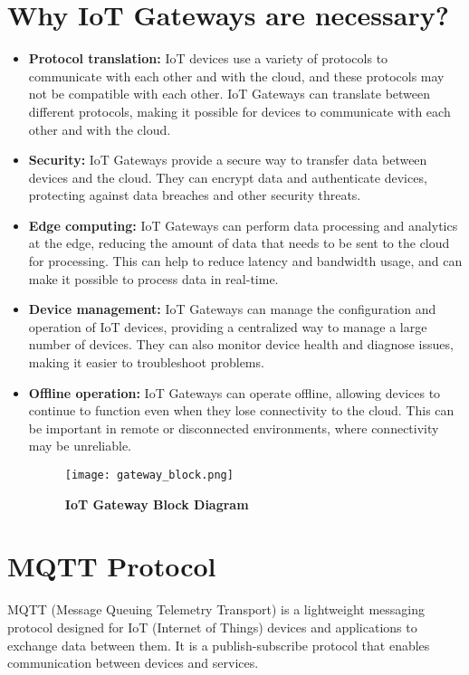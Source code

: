 \documentclass[12pt]{article}
\begin{document}
\section*{Why IoT Gateways are necessary?}
\begin{itemize}

\item \textbf{Protocol translation:} IoT devices use a variety of protocols to communicate with each other and with the cloud, and these protocols may not be compatible with each other. IoT Gateways can translate between different protocols, making it possible for devices to communicate with each other and with the cloud.

\item \textbf{Security:} IoT Gateways provide a secure way to transfer data between devices and the cloud. They can encrypt data and authenticate devices, protecting against data breaches and other security threats.

\item \textbf{ Edge computing: }IoT Gateways can perform data processing and analytics at the edge, reducing the amount of data that needs to be sent to the cloud for processing. This can help to reduce latency and bandwidth usage, and can make it possible to process data in real-time.

\item \textbf{Device management: }IoT Gateways can manage the configuration and operation of IoT devices, providing a centralized way to manage a large number of devices. They can also monitor device health and diagnose issues, making it easier to troubleshoot problems.

\item \textbf{Offline operation:} IoT Gateways can operate offline, allowing devices to continue to function even when they lose connectivity to the cloud. This can be important in remote or disconnected environments, where connectivity may be unreliable.
 \begin{figure}[h]
\centering
\texttt{[image: gateway\_block.png]}
\caption{\textbf{IoT Gateway Block Diagram}}
\label{gateway_block}
\end{figure}
\end{itemize}
\section{MQTT Protocol}
MQTT (Message Queuing Telemetry Transport) is a lightweight messaging protocol designed for IoT (Internet of Things) devices and applications to exchange data between them. It is a publish-subscribe protocol that enables communication between devices and services.
\end{document}
